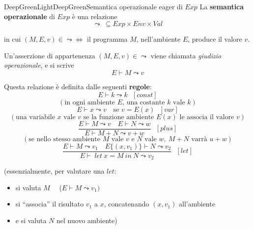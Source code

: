 \documentclass[a4paper,11pt]{report}
\begin{document}
\begin{cdefframe}{DeepGreenLight}{DeepGreen}{Semantica operazionale eager di \( Exp \)}{}
    La \textbf{semantica operazionale} di \( Exp \) è una relazione
    \[ \leadsto \ \subseteq Exp \times Env \times Val\]

    in cui \( (M, E, v) \in \leadsto \iff \) il programma \( M \), nell'ambiente \( E \), produce il valore \( v \).

    \vspace{0.5em}

    Un'asserzione di appartenenza \( (M, E, v) \in \leadsto\) viene chiamata \textit{giudizio operazionale}, e si scrive
    \[ E \vdash M \leadsto v \]


    Questa relazione è definita dalle seguenti \textbf{regole}:
    \[ E \vdash k \leadsto k  \ \ \ [ const ] \] 
    \vspace{-1.5em}
    {\small\color{gray}\[ (\text{in ogni ambiente } E \text{, una costante } k \text{ vale } k )\]}
    \vspace{-1em}
    \[ E \vdash x \leadsto v  \ \ \ \text{ se }  v = E(x) \ \ \ [ var ] \]
    \vspace{-1.5em}
    {\small\color{gray}\[ (\text{una variabile } x \text{ vale } v \text{ se la funzione ambiente } E(x) \text{ le associa il valore } v )\]}
    \vspace{-0.5em}
    \[
        \frac{
            E \vdash M \leadsto v \quad E \vdash N \leadsto w
        }{
            E \vdash M + N \leadsto v + w
        }
        \ \ \ [plus]
    \]
    {\small\color{gray}\[ (\text{se nello stesso ambiente } M \text{ vale } v \text{ e } N \text{ vale } w, \ M+N \text{ varrà } u+w)\]}
    \vspace{-0.5em}
    \[
        \frac{
            E \vdash M \leadsto v_1 \quad E\{(x, v_1)\} \vdash N \leadsto v_2
        }{
            E \vdash \ let \ x = M \ in \ N \leadsto v_2
        }
        \ \ \  [let]
    \]

    {\color{gray}(essenzialmente, per valutare una \( let \):
        \begin{itemize}
            \item \color{gray}si valuta \( M\) \ \ (\( E \vdash M \leadsto v_1) \)
            \item si ``associa'' il risultato \( v_1 \) a \( x \), concatenando \( (x, v_1) \) all'ambiente
            \item e si valuta \( N \) nel nuovo ambiente)
    \end{itemize} }
\end{cdefframe}
\end{document}
